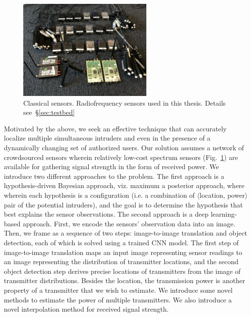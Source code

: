 \begin{figure}[t]
      \centering
      \includegraphics[width=0.6\textwidth]{chapters/introduction/figures/SDR.png}
      \caption{Classical sensors. Radiofrequency sensors used in this thesis. Details see~\S\ref{sec:testbed}} 
      \label{fig:intro-sdr}
\end{figure}

Motivated by the above, we seek an effective technique that can accurately localize multiple simultaneous
intruders and even in the presence of a dynamically changing set of authorized users.
Our solution assumes a network of crowdsourced sensors wherein relatively low-cost spectrum sensors (Fig.~\ref{fig:intro-sdr}) are available
for gathering signal strength in the form of received power.
We introduce two different approaches to the \mtl problem.
The first approach is a hypothesis-driven Bayesian approach, viz. maximum a posterior approach, where wherein each hypothesis is a configuration
(i.e. a combination of $\langle$location, power$\rangle$ pair of the potential intruders), and the goal is to determine the hypothesis 
that best explains the sensor observations.
The second approach is a deep learning-based approach. First, we encode the sensors' observation data into an image.
Then, we frame \mtl as a sequence of two steps: image-to-image translation 
and object detection, each of which is solved using a trained CNN model. 
The first step of image-to-image translation maps an input image representing sensor readings to an image
representing the distribution of transmitter locations, and the second object detection step derives precise locations of
transmitters from the image of transmitter distributions. 
Besides the location, the transmission power is another property of a transmitter that we wish to estimate.
We introduce some novel methods to estimate the power of multiple transmitters.
We also introduce a novel interpolation method for received signal strength.


